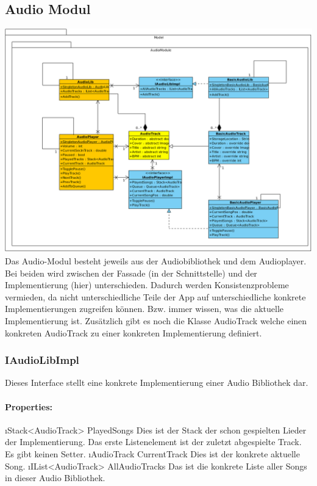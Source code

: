 \documentclass[../entwurf.tex]{subfiles}
\begin{document}
		\subsection{Audio Modul}
			\includegraphics[scale=0.3]{../graphics/uml_diagramme/AudioModule.png}\\
			Das Audio-Modul besteht jeweils aus der Audiobibliothek und dem Audioplayer.
			Bei beiden wird zwischen der Fassade (in der Schnittstelle) und der Implementierung (hier) unterschieden.
			Dadurch werden Konsistenzprobleme vermieden, da nicht unterschiedliche Teile der App auf unterschiedliche konkrete Implementierungen
			zugreifen können. Bzw. immer wissen, was die aktuelle Implementierung ist.
			Zusätzlich gibt es noch die Klasse AudioTrack welche einen konkreten AudioTrack zu einer konkreten Implementierung definiert.
			\subsubsection{IAudioLibImpl}
				Dieses Interface stellt eine konkrete Implementierung einer Audio Bibliothek dar.
				\paragraph{Properties:}
					\begin{itemize}
						\i{Stack<AudioTrack> PlayedSongs} Dies ist der Stack der schon gespielten Lieder der Implementierung.
						Das erste Listenelement ist der zuletzt abgespielte Track. Es gibt keinen Setter.
						\i{AudioTrack CurrentTrack} Dies ist der konkrete aktuelle Song.
						\i{IList<AudioTrack> AllAudioTracks} Das ist die konkrete Liste aller Songs in dieser Audio Bibliothek.
					\end{itemize}
\end{document}
